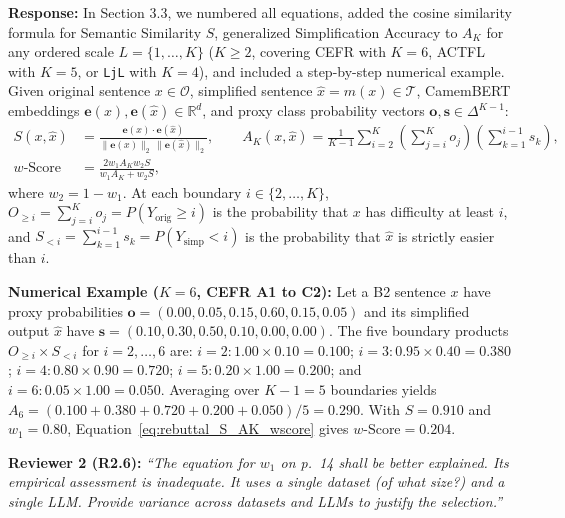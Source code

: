 \documentclass[11pt,a4paper]{article}
\begin{document}
\noindent\textbf{Response:}
In Section 3.3, we numbered all equations, added the cosine similarity formula for Semantic Similarity $S$, generalized Simplification Accuracy to $A_K$ for any ordered scale $L = \{1, \dots, K\}$ ($K \ge 2$, covering CEFR with $K=6$, ACTFL with $K=5$, or \texttt{LjL} with $K=4$), and included a step-by-step numerical example. Given original sentence $x \in \mathcal{O}$, simplified sentence $\hat{x} = m(x) \in \mathcal{T}$, CamemBERT embeddings $\mathbf{e}(x), \mathbf{e}(\hat{x}) \in \mathbb{R}^d$, and proxy class probability vectors $\mathbf{o}, \mathbf{s} \in \Delta^{K-1}$:
\begin{equation}\label{eq:rebuttal_S_AK_wscore}
\begin{aligned}
S(x, \hat{x}) &= \frac{\mathbf{e}(x) \cdot \mathbf{e}(\hat{x})}{\|\mathbf{e}(x)\|_2 \, \|\mathbf{e}(\hat{x})\|_2}, \qquad
A_K(x, \hat{x}) = \frac{1}{K - 1} \sum_{i=2}^{K} \left( \sum_{j=i}^{K} o_j \right) \left( \sum_{k=1}^{i-1} s_k \right), \\
w\text{-Score} &= \frac{2 w_1 A_K w_2 S}{w_1 A_K + w_2 S},
\end{aligned}
\end{equation}
where $w_2 = 1 - w_1$. At each boundary $i \in \{2, \dots, K\}$, $O_{\ge i} = \sum_{j=i}^{K} o_j = P(Y_{\text{orig}} \ge i)$ is the probability that $x$ has difficulty at least $i$, and $S_{< i} = \sum_{k=1}^{i-1} s_k = P(Y_{\text{simp}} < i)$ is the probability that $\hat{x}$ is strictly easier than $i$.

\noindent\textbf{Numerical Example ($K = 6$, CEFR A1 to C2):} Let a B2 sentence $x$ have proxy probabilities $\mathbf{o} = (0.00, 0.05, 0.15, 0.60, 0.15, 0.05)$ and its simplified output $\hat{x}$ have $\mathbf{s} = (0.10, 0.30, 0.50, 0.10, 0.00, 0.00)$. The five boundary products $O_{\ge i} \times S_{< i}$ for $i = 2, \dots, 6$ are: $i=2: 1.00 \times 0.10 = 0.100$; $i=3: 0.95 \times 0.40 = 0.380$; $i=4: 0.80 \times 0.90 = 0.720$; $i=5: 0.20 \times 1.00 = 0.200$; and $i=6: 0.05 \times 1.00 = 0.050$. Averaging over $K-1 = 5$ boundaries yields $A_6 = (0.100 + 0.380 + 0.720 + 0.200 + 0.050)/5 = 0.290$. With $S = 0.910$ and $w_1 = 0.80$, Equation~\ref{eq:rebuttal_S_AK_wscore} gives $w\text{-Score} = 0.204$.

\begin{reviewbox}
\textbf{Reviewer 2 (R2.6):} \textit{``The equation for $w_1$ on p.\ 14 shall be better explained. Its empirical assessment is inadequate. It uses a single dataset (of what size?) and a single LLM. Provide variance across datasets and LLMs to justify the selection.''}
\end{reviewbox}
\end{document}

